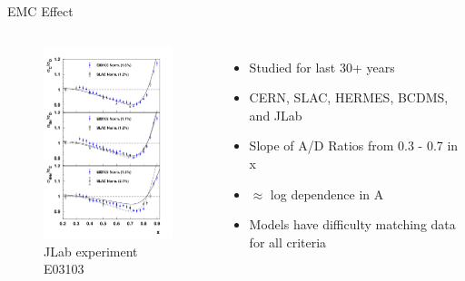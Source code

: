 \documentclass[12pt]{beamer}
\begin{document}
\begin{frame}{EMC Effect}
\begin{columns}
\vspace{-20pt}
\begin{figure}
\caption*{\label{E03103} JLab experiment E03103 \cite{E3103} }
\vspace{-20pt}
\includegraphics[width =5cm]{../images/carbon_be_he4}
\end{figure}
\hspace{10pt}
\begin{itemize}
		\item Studied for last 30+ years
		\item CERN, SLAC, HERMES, BCDMS, and JLab
		\item Slope of A/D Ratios from 0.3 - 0.7 in x
		\item $\approx$ log dependence in A
		\item Models have difficulty matching data for all criteria
\end{itemize}

\end{columns}
\end{frame}




\end{document}
